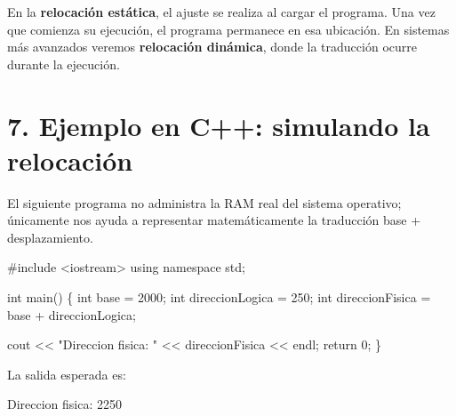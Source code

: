 \documentclass[
  spanish,
  letterpaper,
]{scrbook}
\newenvironment{Shaded}{\begin{snugshade}}{\end{snugshade}}
\newcommand{\NormalTok}[1]{\textcolor[rgb]{0.00,0.23,0.31}{#1}}
\begin{document}
\begin{tcolorbox}[enhanced jigsaw, arc=.35mm, bottomrule=.15mm, bottomtitle=1mm, breakable, colback=white, colbacktitle=quarto-callout-important-color!10!white, colframe=quarto-callout-important-color-frame, coltitle=black, left=2mm, leftrule=.75mm, opacityback=0, opacitybacktitle=0.6, rightrule=.15mm, title=\textcolor{quarto-callout-important-color}{\faExclamation}\hspace{0.5em}{No confundamos los momentos}, titlerule=0mm, toprule=.15mm, toptitle=1mm]

En la \textbf{relocación estática}, el ajuste se realiza al cargar el
programa. Una vez que comienza su ejecución, el programa permanece en
esa ubicación. En sistemas más avanzados veremos \textbf{relocación
dinámica}, donde la traducción ocurre durante la ejecución.

\end{tcolorbox}

\section{7. Ejemplo en C++: simulando la
relocación}\label{ejemplo-en-c-simulando-la-relocaciuxf3n}

El siguiente programa no administra la RAM real del sistema operativo;
únicamente nos ayuda a representar matemáticamente la traducción base +
desplazamiento.

\begin{Shaded}
\begin{Highlighting}[]
\NormalTok{\#include \textless{}iostream\textgreater{}}
\NormalTok{using namespace std;}

\NormalTok{int main() \{}
\NormalTok{    int base = 2000;}
\NormalTok{    int direccionLogica = 250;}
\NormalTok{    int direccionFisica = base + direccionLogica;}

\NormalTok{    cout \textless{}\textless{} "Direccion fisica: " \textless{}\textless{} direccionFisica \textless{}\textless{} endl;}
\NormalTok{    return 0;}
\NormalTok{\}}
\end{Highlighting}
\end{Shaded}

La salida esperada es:

\begin{Shaded}
\begin{Highlighting}[]
\NormalTok{Direccion fisica: 2250}
\end{Highlighting}
\end{Shaded}
\end{document}
